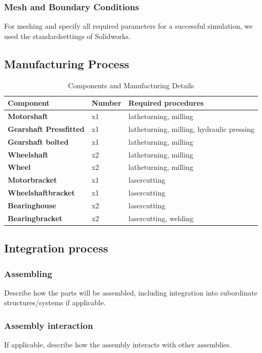 \subsubsection{Mesh and Boundary Conditions}
For meshing and specify all required parameters for a successful simulation, we used the standardsettings of Solidworks.

\subsection{Manufacturing Process}
\begin{table}[H]
\centering
\begin{adjustbox}{width=\textwidth}
\begin{tabular}{|>{\bfseries}m{5cm}|m{}|m{8cm}|}
\hline
Component & Number & Required procedures \\
\hline
Motorshaft & x1 & latheturning, milling \\
\hline
Gearshaft Pressfitted & x1 & latheturning, milling, hydraulic pressing \\
\hline
Gearshaft bolted & x1 & latheturning, milling \\
\hline
Wheelshaft & x2 & latheturning, milling \\
\hline
Wheel & x2 & latheturning, milling \\
\hline
Motorbracket & x1 & lasercutting  \\
\hline
Wheelshaftbracket & x1 & lasercutting  \\
\hline
Bearinghouse & x2 & lasercutting  \\
\hline
Bearingbracket & x2 & lasercutting, welding \\
\hline
\end{tabular}
\end{adjustbox}
\caption{Components and Manufacturing Details}
\label{table:components}
\end{table}

\subsection{Integration process}

\subsubsection{Assembling}
Describe how the parts will be assembled, including integration into subordinate structures/systems if applicable.

\subsubsection{Assembly interaction}
If applicable, describe how the assembly interacts with other assemblies.



